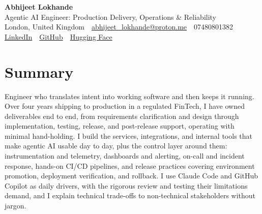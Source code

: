 \documentclass[10pt,a4paper]{article}
\newcommand{\sep}{\,\textcolor{accent!60}{\textbar}\,}
\begin{document}
\begin{center}
  {\fontsize{24}{26}\selectfont\bfseries Abhijeet Lokhande}\\[3pt]
  {\color{accent}\large Agentic AI Engineer: Production Delivery, Operations \& Reliability}\\[5pt]
  {\small
    London, United Kingdom \sep
    \href{mailto:abhijeet_lokhande@proton.me}{abhijeet\_lokhande@proton.me} \sep
    07480801382 \\[2pt]
    \href{https://www.linkedin.com/in/ablds/}{LinkedIn} \sep
    \href{https://github.com/abhijeetscode}{GitHub} \sep
    \href{https://huggingface.co/ab-ai}{Hugging Face}
  }
\end{center}
\vspace{2pt}

\section{Summary}
Engineer who translates intent into working software and then keeps it running. Over four years shipping to production in a regulated FinTech, I have owned deliverables end to end, from requirements clarification and design through implementation, testing, release, and post-release support, operating with minimal hand-holding. I build the services, integrations, and internal tools that make agentic AI usable day to day, plus the control layer around them: instrumentation and telemetry, dashboards and alerting, on-call and incident response, hands-on CI/CD pipelines, and release practices covering environment promotion, deployment verification, and rollback. I use Claude Code and GitHub Copilot as daily drivers, with the rigorous review and testing their limitations demand, and I explain technical trade-offs to non-technical stakeholders without jargon.

\end{document}
